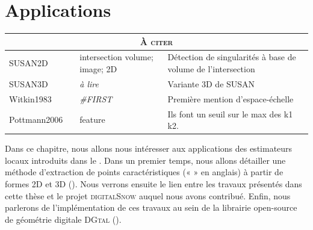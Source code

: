 %
\chapter{Applications}
\label{sec:applications}


\setcounter{minitocdepth}{3}
\minitoc

\newpage

\begin{table}[h]
\begin{tabular}{@{}p{2cm}lp{2cm}p{8cm}@{}}
\toprule
\multicolumn{4}{c}{\textsc{À citer}} \\ \midrule
SUSAN2D & \cite{SUSAN2D} & intersection volume; image; 2D     & Détection de singularités à base de volume de l'intersection \\
SUSAN3D & \cite{SUSAN3D} & \emph{à lire} & Variante 3D de SUSAN \\
Witkin1983 & \cite{Witkin1983} & \emph{\#FIRST} & Première mention d'espace-échelle \\
Pottmann2006 & \cite{Yang2006} & feature & Ils font un seuil sur le max des k1 k2. \\

\bottomrule
\end{tabular}
\end{table}

\newpage

Dans ce chapitre, nous allons nous intéresser aux applications des estimateurs
locaux introduits dans le . Dans un premier temps,
nous allons détailler une méthode d'extraction de points caractéristiques («
 » en anglais) à partir de formes 2D et 3D
().
%
%
Nous verrons ensuite le lien entre les travaux présentés dans cette thèse et le
projet \textsc{digitalSnow} auquel nous avons contribué. Enfin, nous parlerons
de l'implémentation de ces travaux au sein de la librairie open-source de
géométrie digitale \textsc{DGtal} \cite{DGtal}
().
%
